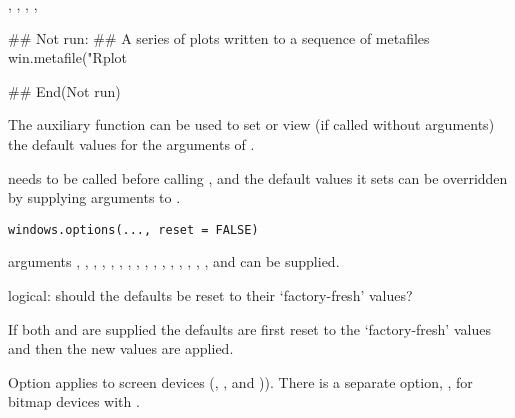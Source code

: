 %
\begin{SeeAlso}\relax
{},
, ,
, 
\end{SeeAlso}
%
\begin{Examples}
\begin{ExampleCode}
## Not run: ## A series of plots written to a sequence of metafiles
win.metafile("Rplot%

## End(Not run)
\end{ExampleCode}
\end{Examples}
%
\begin{Description}\relax
The auxiliary function  can be used to set or view
(if called without arguments) the default values for the arguments of
.

 needs to be called before calling ,
and the default values it sets can be overridden by supplying
arguments to .

\end{Description}
%
\begin{Usage}
\begin{verbatim}
windows.options(..., reset = FALSE)
\end{verbatim}
\end{Usage}
%
\begin{Arguments}
\begin{ldescription}
\item[\code{...}] arguments , , ,
, , , ,
, , , , ,
, , ,
,  and  can be supplied.
\item[\code{reset}] logical: should the defaults be reset to their
`factory-fresh' values?
\end{ldescription}
\end{Arguments}
%
\begin{Details}\relax
If both  and  are supplied the defaults
are first reset to the `factory-fresh' values and then the new
values are applied.

Option  applies to screen devices (,
,  and )).  There is a separate option,
, for bitmap devices with .
\end{Details}
